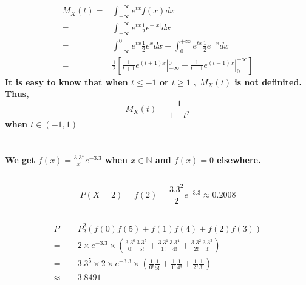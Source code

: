 \documentclass{article}
\begin{document}
        \paragraph{
            \begin{equation*}
                \begin{split}
                    M_X(t)=&\int_{-\infty}^{+\infty} e^{tx}f(x)dx\\
                        =&\int_{-\infty}^{+\infty} e^{tx}\frac{1}{2}e^{-|x|}dx\\
                        =&\int_{-\infty}^0 e^{tx}\frac{1}{2}e^{x}dx+\int_{0}^{+\infty} e^{tx}\frac{1}{2}e^{-x}dx\\
                        =&\frac{1}{2}[\frac{1}{t+1}e^{(t+1)x}|_{-\infty}^0+\frac{1}{t-1}e^{(t-1)x}|_0^{+\infty}]
                \end{split}
            \end{equation*}
            It is easy to know that when $t\leq-1$ or $t\geq 1$ , $M_X(t)$ is not definited. Thus,$$M_X(t)=\frac{1}{1-t^2}$$ when $t\in (-1,1)$
        }

    \section{}
        \paragraph{
            We get 
            $f(x)=\frac{3.3^x}{x!}e^{-3.3}$
            when $x\in\mathbb{N}$ and $f(x)=0$ elsewhere.
        }
        \subsection{}   
            \paragraph{
               $$P(X=2)=f(2)=\frac{3.3^2}{2}e^{-3.3}\approx 0.2008$$
            }
        \subsection{}
            \paragraph{
                \begin{equation*}
                    \begin{split}
                        P=&P_2^2(f(0)f(5)+f(1)f(4)+f(2)f(3))\\
                            =&2\times e^{-3.3}\times(\frac{3.3^0}{0!}\frac{3.3^5}{5!}+\frac{3.3^1}{1!}\frac{3.3^4}{4!}+\frac{3.3^2}{2!}\frac{3.3^3}{3!})\\
                            =&3.3^5\times 2 \times e^{-3.3}\times(\frac{1}{0!}\frac{1}{5!}+\frac{1}{1!}\frac{1}{4!}+\frac{1}{2!}\frac{1}{3!})\\
                            \approx& 3.8491
                    \end{split}
                \end{equation*}
            }
\end{document}
